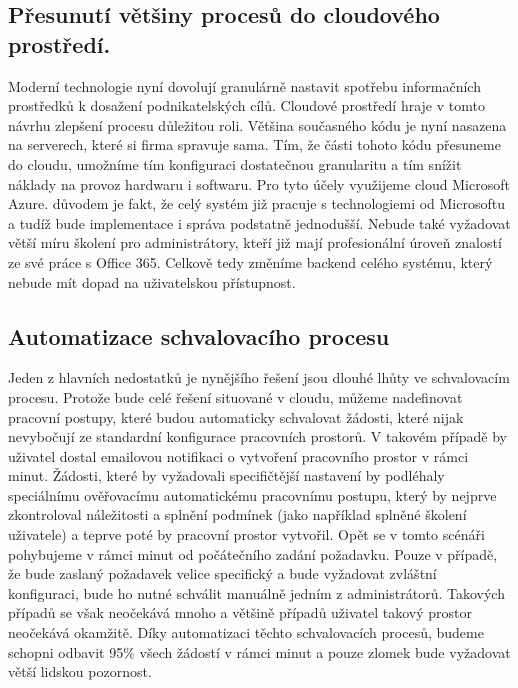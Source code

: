 \documentclass[12pt]{article}
\begin{document}
\begin{sloppypar}
\begin{spacing}{1.15}
        \subsection*{Přesunutí většiny procesů do cloudového prostředí.}
        Moderní technologie nyní dovolují granulárně nastavit spotřebu
        informačních prostředků k dosažení podnikatelských cílů. Cloudové
        prostředí hraje v tomto návrhu zlepšení procesu důležitou roli. Většina
        současného kódu je nyní nasazena na serverech, které si firma spravuje
        sama. Tím, že části tohoto kódu přesuneme do cloudu, umožníme tím
        konfiguraci dostatečnou granularitu a tím snížit náklady na provoz
        hardwaru i softwaru. Pro tyto účely využijeme cloud Microsoft Azure.
        důvodem je fakt, že celý systém již pracuje s  technologiemi od
        Microsoftu a tudíž bude implementace i správa podstatně jednodušší.
        Nebude také vyžadovat větší míru školení pro administrátory, kteří již
        mají profesionální úroveň znalostí ze své práce s Office 365. Celkově
        tedy změníme backend celého systému, který nebude mít dopad na
        uživatelskou přístupnost.
        
        \subsection*{Automatizace schvalovacího procesu}
        Jeden z hlavních nedostatků je nynějšího řešení jsou dlouhé lhůty ve
        schvalovacím procesu. Protože bude celé řešení situované v cloudu, můžeme
        nadefinovat pracovní postupy, které budou automaticky schvalovat
        žádosti, které nijak nevybočují ze standardní konfigurace pracovních
        prostorů. V takovém případě by uživatel dostal emailovou notifikaci o
        vytvoření pracovního prostor v rámci minut. Žádosti, které by
        vyžadovali specifičtější nastavení by podléhaly speciálnímu ověřovacímu
        automatickému pracovnímu postupu, který by nejprve zkontroloval
        náležitosti a splnění podmínek (jako například splněné školení uživatele)
        a teprve poté by pracovní prostor vytvořil. Opět se v tomto scénáři
        pohybujeme v rámci minut od počátečního zadání požadavku. Pouze v
        případě, že bude zaslaný požadavek velice specifický a bude vyžadovat
        zvláštní konfiguraci, bude ho nutné schválit manuálně jedním z
        administrátorů. Takových případů se však neočekává mnoho a většině
        případů uživatel takový prostor neočekává okamžitě. Díky automatizaci
        těchto schvalovacích procesů, budeme schopni odbavit 95\% všech žádostí
        v rámci minut a pouze zlomek bude vyžadovat větší lidskou pozornost.


\end{spacing}
\end{sloppypar}
\end{document}
